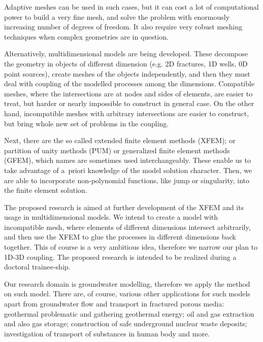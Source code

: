 \documentclass{sna}
\begin{document}
Adaptive meshes can be used in such cases, but it can cost a lot of computational power to build a very fine mesh,
and solve the problem with enormously increasing number of degrees of freedom.
It also require very robust meshing techniques when complex geometries are in question.

Alternatively, multidimensional models are being developed. These decompose the geometry
in objects of different dimension (e.g. 2D fractures, 1D wells, 0D point sources), create meshes of the objects independently,
and then they must deal with coupling of the modelled processes among the dimensions. 
Compatible meshes, where the intersections are at nodes and sides of elements, are easier to treat, but harder
or nearly impossible to construct in general case. On the other hand, incompatible meshes with arbitrary intersections are easier to construct, 
but bring whole new set of problems in the coupling.

Next, there are the so called extended finite element methods (XFEM); or partition of unity methods (PUM) or generalized
finite element methods (GFEM), which names are sometimes used interchangeably. 
These enable us to take advantage of a~priori knowledge of the model solution character.
Then, we are able to incorporate non-polynomial functions, like jump or singularity, into the finite element solution.
\newline{}

The proposed research is aimed at further development of the XFEM and its usage in multidimensional models. 
We intend to create a model with incompatible mesh, where elements of different dimensions intersect
arbitrarily, and then use the XFEM to glue the processes in different dimensions back together. 
This of course is a very ambitious idea, therefore we narrow our plan to 1D-3D coupling. 
The proposed research is intended to be realized during a doctoral trainee-ship. 

Our research domain is groundwater modelling, therefore we apply the method on such model.
There are, of course, various other applications for such models apart from groundwater flow and transport in fractured porous media:
geothermal problematic and gathering geothermal energy; oil and gas extraction and also gas storage;
construction of safe underground nuclear waste deposits; investigation of transport of substances in human body
and more.


\end{document}
